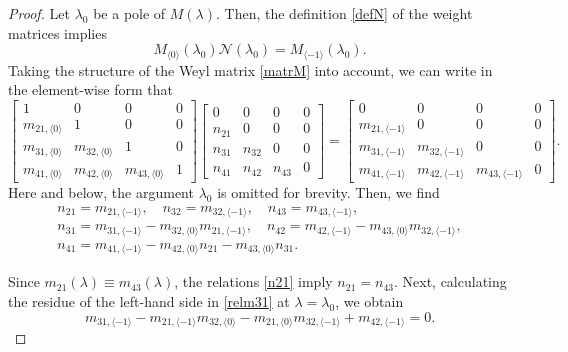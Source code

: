 \documentclass[a4paper,12pt]{article}
\newcommand{\la}{\lambda}
\theoremstyle{plain}
\numberwithin{equation}{section}
\theoremstyle{definition}
\theoremstyle{remark}
\begin{document}
\begin{proof}
Let $\la_0$ be a pole of $M(\la)$. Then, the definition \eqref{defN} of the weight matrices implies
$$
M_{\langle 0 \rangle}(\la_0) \mathcal N(\la_0) = M_{\langle -1 \rangle}(\la_0).
$$
Taking the structure of the Weyl matrix \eqref{matrM} into account, we can write in the element-wise form that
$$
\begin{bmatrix}
1 & 0 & 0 & 0 \\
m_{21, \langle 0 \rangle} & 1 & 0 & 0 \\
m_{31, \langle 0 \rangle} & m_{32, \langle 0 \rangle} & 1 & 0 \\
m_{41, \langle 0 \rangle} & m_{42, \langle 0 \rangle} & m_{43, \langle 0 \rangle} & 1
\end{bmatrix}
\begin{bmatrix}
0 & 0 & 0 & 0 \\
n_{21} & 0 & 0 & 0 \\
n_{31} & n_{32} & 0 & 0 \\
n_{41} & n_{42} & n_{43} & 0
\end{bmatrix} = 
\begin{bmatrix}
0 & 0 & 0 & 0 \\
m_{21, \langle -1 \rangle} & 0 & 0 & 0 \\
m_{31, \langle -1 \rangle} & m_{32, \langle -1 \rangle} & 0 & 0 \\
m_{41, \langle -1 \rangle} & m_{42, \langle -1 \rangle} & m_{43, \langle -1 \rangle} & 0
\end{bmatrix}.
$$
Here and below, the argument $\la_0$ is omitted for brevity. Then, we find
\begin{gather} \label{n21}
n_{21} = m_{21, \langle -1 \rangle}, \quad n_{32} = m_{32, \langle -1 \rangle}, \quad n_{43} = m_{43,\langle -1 \rangle}, \\ \label{n31}
n_{31} = m_{31, \langle -1 \rangle} - m_{32,\langle 0 \rangle} m_{21, \langle -1 \rangle}, \quad
n_{42} = m_{42,\langle -1 \rangle} - m_{43,\langle 0 \rangle} m_{32,\langle -1 \rangle}, \\ \label{n41}
n_{41} = m_{41, \langle -1 \rangle} - m_{42,\langle 0 \rangle} n_{21} - m_{43,\langle 0 \rangle} n_{31}.
\end{gather}

Since $m_{21}(\la) \equiv m_{43}(\la)$, the relations \eqref{n21} imply $n_{21} = n_{43}$.
Next, calculating the residue of the left-hand side in \eqref{relm31} at $\la = \la_0$, we obtain
\begin{equation} \label{aux1}
m_{31, \langle -1 \rangle} - m_{21, \langle -1 \rangle} m_{32, \langle 0 \rangle} - m_{21,\langle 0 \rangle} m_{32, \langle -1 \rangle} + m_{42, \langle -1 \rangle} = 0.
\end{equation}


\end{proof}
\end{document}
